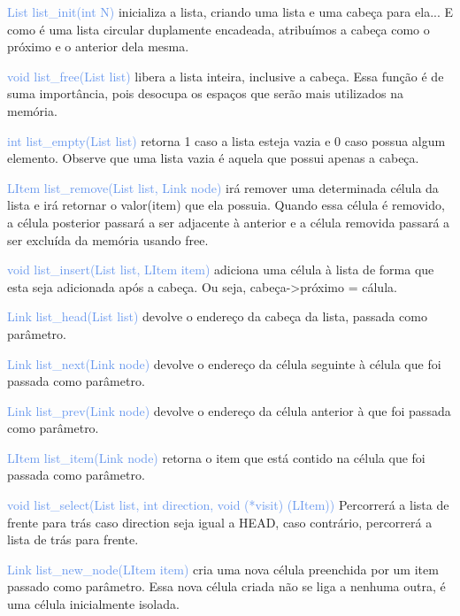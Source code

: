 \documentclass[a4paper,12pt]{article}
\begin{document}
{\textcolor{CornflowerBlue}{List list\_init(int N)}} inicializa a lista, criando uma lista e uma cabeça para ela... E como é uma lista circular duplamente encadeada, atribuímos a cabeça como o próximo e o anterior dela mesma.

{\textcolor{CornflowerBlue}{void list\_free(List list)}} libera a lista inteira, inclusive a cabeça. Essa função é de suma importância, pois desocupa os espaços que serão mais utilizados na memória.

{\textcolor{CornflowerBlue}{int list\_empty(List list)}} retorna 1 caso a lista esteja vazia e 0 caso possua algum elemento.
Observe que uma lista vazia é aquela que possui apenas a cabeça. 

{\textcolor{CornflowerBlue}{LItem list\_remove(List list, Link node)}} irá remover uma determinada célula da lista e irá retornar o valor(item) que ela possuia.
Quando essa célula é removido, a célula posterior passará a ser adjacente à anterior e a célula removida passará a ser excluída da memória usando free.

{\textcolor{CornflowerBlue}{void list\_insert(List list, LItem item)}} adiciona uma célula à lista de forma que esta seja adicionada após a cabeça. Ou seja, cabeça->próximo = cálula. 

{\textcolor{CornflowerBlue}{Link  list\_head(List list)}} devolve o endereço da cabeça da lista, passada como parâmetro.

{\textcolor{CornflowerBlue}{Link  list\_next(Link node)}} devolve o endereço da célula seguinte à célula que foi passada como parâmetro.

{\textcolor{CornflowerBlue}{Link  list\_prev(Link node)}} devolve o endereço da célula anterior à que foi passada como parâmetro.

{\textcolor{CornflowerBlue}{LItem list\_item(Link node)}} retorna o item que está contido na célula que foi passada como parâmetro.

{\textcolor{CornflowerBlue}{void list\_select(List list, int direction, void (*visit) (LItem))}} Percorrerá a lista de frente 
para trás caso direction seja igual a HEAD, caso contrário, percorrerá a lista de trás para frente.

{\textcolor{CornflowerBlue}{Link list\_new\_node(LItem item)}} cria uma nova célula preenchida por um item passado como parâmetro. Essa nova célula criada não se liga a nenhuma outra, é uma célula inicialmente isolada.

\newpage  %
\end{document}

